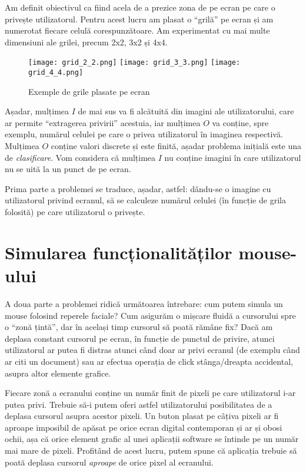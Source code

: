 Am definit obiectivul ca fiind acela de a prezice zona de pe ecran pe care o privește utilizatorul.
Pentru acest lucru am plasat o ``grilă'' pe ecran și am numerotat fiecare celulă corespunzătoare.
Am experimentat cu mai multe dimensiuni ale grilei, precum 2x2, 3x2 și 4x4.

\begin{figure}[H]
    \centering
    \texttt{[image: grid\_2\_2.png]}
    \texttt{[image: grid\_3\_3.png]}
    \texttt{[image: grid\_4\_4.png]}
    \caption{Exemple de grile plasate pe ecran}
    \label{grid-example}
\end{figure}

Așadar, mulțimea $I$ de mai sus va fi alcătuită din imagini ale utilizatorului, care ar permite ``extragerea privirii'' acestuia, iar mulțimea $O$ va conține, spre exemplu, numărul celulei pe care o privea utilizatorul în imaginea respectivă.
Mulțimea $O$ conține valori discrete și este finită, așadar problema inițială este una de \emph{clasificare}.
Vom considera că mulțimea $I$ nu conține imagini în care utilizatorul nu se uită la un punct de pe ecran.

Prima parte a problemei se traduce, așadar, astfel: dându-se o imagine cu utilizatorul privind ecranul, să se calculeze numărul celulei (în funcție de grila folosită) pe care utilizatorul o privește.

\section{Simularea funcționalităților mouse-ului}
A doua parte a problemei ridică următoarea întrebare: cum putem simula un mouse folosind reperele faciale?
Cum asigurăm o mișcare fluidă a cursorului spre o ``zonă țintă'', dar în același timp cursorul să poată rămâne fix?
Dacă am deplasa constant cursorul pe ecran, în funcție de punctul de privire, atunci utilizatorul ar putea fi distras atunci când doar ar privi ecranul (de exemplu când ar citi un document) sau ar efectua operația de click stânga/dreapta accidental, asupra altor elemente grafice.

Fiecare zonă a ecranului conține un număr finit de pixeli pe care utilizatorul i-ar putea privi.
Trebuie să-i putem oferi astfel utilizatorului posibilitatea de a deplasa cursorul asupra acestor pixeli.
Un buton plasat pe câțiva pixeli ar fi aproape imposibil de apăsat pe orice ecran digital contemporan și ar și obosi ochii, așa că orice element grafic al unei aplicații software se întinde pe un număr mai mare de pixeli.
Profitând de acest lucru, putem spune că aplicația trebuie să poată deplasa cursorul \emph{aproape} de orice pixel al ecranului.

